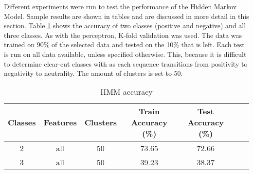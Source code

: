 
\begin{comment}
Experiments / Empirical evaluation (roughly 2-3 pages)
• Any details about experiments (dataset sizes, parameter selection, etc)
• Results
• Analysis (discussion of results / visualization / findings / etc)
\end{comment}

Different experiments were run to test the performance of the Hidden Markov Model. Sample results are shown in tables and are discussed in more detail in this section. Table \ref{table:HMMaccuracy} shows the accuracy of two classes (positive and negative) and all three classes. As with the perceptron, K-fold validation was used. The data was trained on 90\% of the selected data and tested on the 10\% that is left. Each test is run on all data available, unless specified otherwise. This, because it is difficult to determine clear-cut classes with as each sequence transitions from positivity to negativity to neutrality. The amount of clusters is set to 50.

\begin{table}[h!]
\begin{center}
\begin{tabular}{| c | c | c | c | c | c | c |}
\hline
 {\textbf{Classes}} 			& {\textbf{Features}}	& {\textbf{Clusters}} 
 & {\textbf{Train Accuracy (\%)}} 					& {\textbf{Test Accuracy (\%)}} 
 \\
\hline
2 			& all 	& 50			& 73.65		& 72.66 		\\ %
3 			& all	& 50			& 39.23		& 38.37 		\\
\hline
\end{tabular}
\caption{HMM accuracy}
\label{table:HMMaccuracy}
\end{center}
\end{table}

\begin{comment}
\begin{table}[h!]
\begin{center}
\begin{tabular}{| c | c | c | c | c | c |}
\hline
 {\textbf{Classes}} 	
 & {\textbf{Data per class}} 					& {\textbf{Clusters}} 
 & {\textbf{Train Accuracy (\%)}} 					& {\textbf{Test Accuracy (\%)}} 
 \\
\hline
2 			& 500 		& 50			& 73.65		& 72.66 		\\ %
3 			& 500 		& 50			& 39.23		& 38.37 		\\
\hline
\end{tabular}
\caption{HMM accuracy}
\label{table:HMMaccuracy}
\end{center}
\end{table}
\end{comment}

